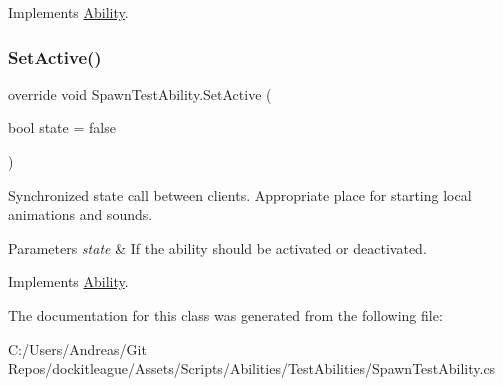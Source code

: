 Implements \hyperlink{class_ability_a7722265862f8b29828315725415ce266}{Ability}.

\hypertarget{class_spawn_test_ability_a238beca9f6296b80e950525108b97193}{}\label{class_spawn_test_ability_a238beca9f6296b80e950525108b97193} 
\subsubsection{\texorpdfstring{Set\+Active()}{SetActive()}}
{\footnotesize\ttfamily override void Spawn\+Test\+Ability.\+Set\+Active (\begin{DoxyParamCaption}\item[{bool}]{state = {\ttfamily false} }\end{DoxyParamCaption})\hspace{0.3cm}{\ttfamily [virtual]}}



Synchronized state call between clients. Appropriate place for starting local animations and sounds. 


\begin{DoxyParams}{Parameters}
{\em state} & If the ability should be activated or deactivated.\\
\hline
\end{DoxyParams}


Implements \hyperlink{class_ability_a10f7f3c2b63eeef6e352aee48d246384}{Ability}.



The documentation for this class was generated from the following file\+:\begin{DoxyCompactItemize}
\item 
C\+:/\+Users/\+Andreas/\+Git Repos/dockitleague/\+Assets/\+Scripts/\+Abilities/\+Test\+Abilities/Spawn\+Test\+Ability.\+cs\end{DoxyCompactItemize}
